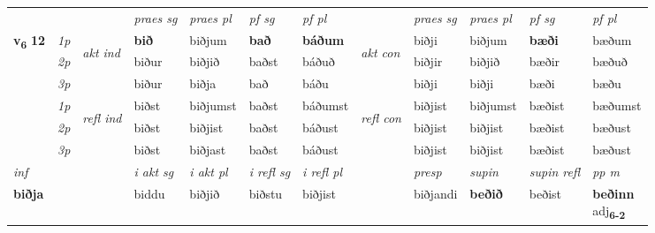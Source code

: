 \begin{longtable}[l]{X>{\footnotesize\itshape}llXXXXlXXXX}
 & &   & \textit{praes sg}  & \textit{praes pl}    & \textit{ pf sg} & \textit{pf pl} & & \textit{praes sg}  & \textit{praes pl}    & \textit{pf sg} & \textit{pf pl }  \\ \cmidrule{4-7} \cmidrule{9-12}
 \multirow{2}{*}{{{\textbf{v{\textsubscript{6}}} \Large{\textbf{12}}}}}  & 1p & \multirow{3}{*}{\begin{turn}{90}\textit{akt ind}\end{turn}} & \textbf{bið} & biðjum & \textbf{bað} & \textbf{báðum} & \multirow{3}{*}{\begin{turn}{90}\textit{akt con}\end{turn}} &biðji & biðjum & \textbf{bæði} & bæðum\\*
 & 2p &  &  biður  & biðjið & baðst & báðuð & & biðjir & biðjið & bæðir & bæðuð \\*
 & 3p &  & biður & biðja & bað & báðu & & biðji & biðji& bæði & bæðu \\*
\cmidrule{4-7} \cmidrule{9-12}
 & 1p & \multirow{3}{*}{\begin{turn}{90}\textit{refl ind}\end{turn}}  & biðst & biðjumst & baðst & báðumst & \multirow{3}{*}{\begin{turn}{90}\textit{refl con}\end{turn}}  &biðjist & biðjumst & bæðist & bæðumst \\*
 & 2p &  & biðst & biðjist & baðst & báðust & &biðjist & biðjist & bæðist & bæðust \\*
 & 3p  & & biðst & biðjast & baðst & báðust & & biðjist & biðjist& bæðist & bæðust \\*
\cmidrule{4-7} \cmidrule{9-12}

   {\textit{inf}} & &  & \textit{i akt sg} & \textit{i akt pl} & \textit{i refl sg} & \textit{i refl pl} && \textit{presp} & \textit{supin} & \textit{supin refl} & \textit{pp m} \\*
  {\textbf{biðja}} & && biddu  & biðjið & biðstu & biðjist && biðjandi &  \textbf{beðið} & beðist & \specialcell{\textbf{beðinn} \\ adj\textbf{\textsubscript{6-2}}} \\*

\midrule


\end{longtable}
